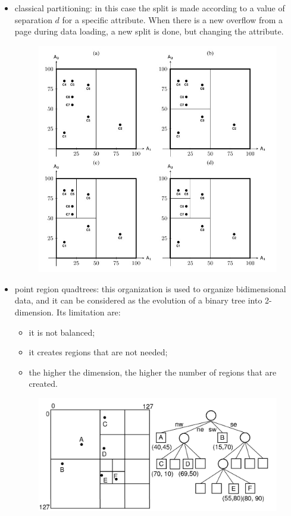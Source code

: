 \begin{itemize}
    \item classical partitioning: in this case the split is made according to a value of separation $d$ for a specific attribute. When there is a new overflow from a page during data loading, a new split is done, but changing the attribute.

    \begin{figure}[h!]
		\centering
		\includegraphics[scale = 1.2]{img/part1.jpg}
		\label{part1}
    \end{figure}

    \item point region quadtrees: this organization is used to organize bidimensional data, and it can be considered as the evolution of a binary tree into 2-dimension. Its limitation are:

    \begin{itemize}
        \item it is not balanced;
        \item it creates regions that are not needed;
        \item the higher the dimension, the higher the number of regions that are created.
    \end{itemize}

    \begin{figure}[h!]
		\centering
		\includegraphics[scale = 0.5]{img/part2.jpg}
		\label{part2}
    \end{figure}


\end{itemize}
